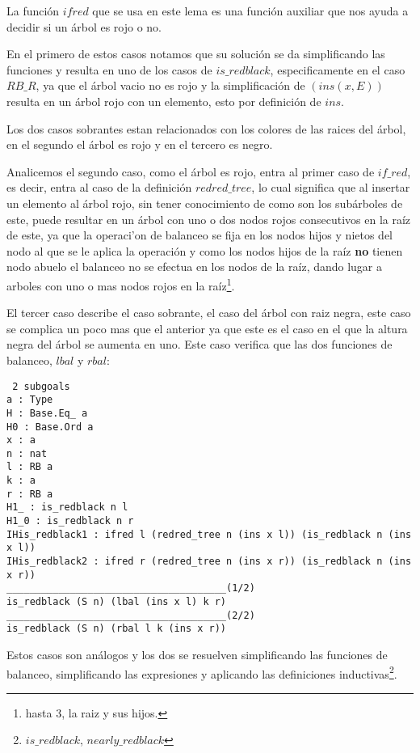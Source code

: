 La funci\'on $ifred$ que se usa en este lema es una funci\'on auxiliar que nos ayuda a decidir si
un \'arbol es rojo o no.

En el primero de estos casos notamos que su soluci\'on se da simplificando las funciones y resulta
en uno de los casos de $is\_redblack$, especificamente en el caso $RB\_R$, ya que el \'arbol vacio
no es rojo y la simplificaci\'on de $(ins(x,E))$ resulta en un \'arbol rojo con un elemento, esto
por definici\'on de $ins$.

Los dos casos sobrantes estan relacionados con los colores de las raices del \'arbol, en el
segundo el \'arbol es rojo y en el tercero es negro.

Analicemos el segundo caso, como el \'arbol es rojo, entra al primer caso de $if\_red$, es decir,
entra al caso de la definici\'on $redred\_tree$, lo cual significa que al insertar un elemento al
\'arbol rojo, sin tener conocimiento de como son los subárboles de este, puede resultar en un
\'arbol con uno o dos nodos rojos consecutivos en la ra\'iz de este, ya que la operaci'on de
balanceo se fija en los nodos hijos y nietos del nodo al que se le aplica la operaci\'on y como
los nodos hijos de la raíz \textbf{no} tienen nodo abuelo el balanceo no se efectua en los nodos
de la raíz, dando lugar a arboles con uno o mas nodos rojos en la raíz\footnote{hasta 3, la raiz y
sus hijos.}.

El tercer caso describe el caso sobrante, el caso del \'arbol con raiz negra, este caso se
complica un poco mas que el anterior ya que este es el caso en el que la altura negra del \'arbol
se aumenta en uno. Este caso verifica que las dos funciones de balanceo, $lbal$ y $rbal$:

\begin{verbatim}
 2 subgoals
a : Type
H : Base.Eq_ a
H0 : Base.Ord a
x : a
n : nat
l : RB a
k : a
r : RB a
H1_ : is_redblack n l
H1_0 : is_redblack n r
IHis_redblack1 : ifred l (redred_tree n (ins x l)) (is_redblack n (ins x l))
IHis_redblack2 : ifred r (redred_tree n (ins x r)) (is_redblack n (ins x r))
______________________________________(1/2)
is_redblack (S n) (lbal (ins x l) k r)
______________________________________(2/2)
is_redblack (S n) (rbal l k (ins x r))
\end{verbatim}

Estos casos son análogos y los dos se resuelven simplificando las funciones de balanceo,
simplificando las expresiones y aplicando las definiciones inductivas\footnote{$is\_redblack$,
$nearly\_redblack$}.

